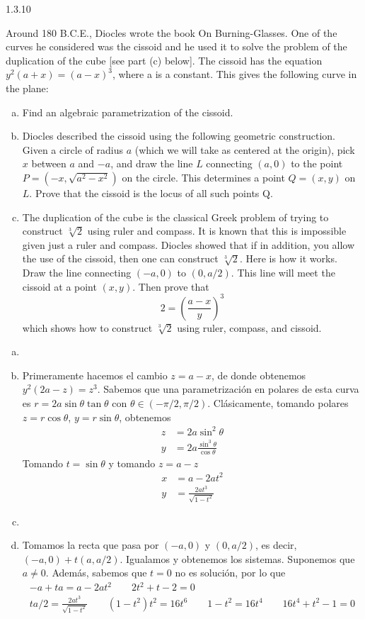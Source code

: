 \documentclass[twoside]{article}
\begin{document}
\begin{ejercicio}{1.3.10}

\end{ejercicio} Around 180 B.C.E., Diocles wrote the book On Burning-Glasses. One of the curves he considered was the cissoid and he used it to solve the problem of the duplication of the cube [see part (c) below]. The cissoid has the equation $y^2(a + x) = (a − x)^3$, where a is
a constant. This gives the following curve in the plane:
\begin{enumerate}[a.]
\item Find an algebraic parametrization of the cissoid.
\item Diocles described the cissoid using the following geometric construction. Given a circle of radius $a$ (which we will take as centered at the origin), pick $x$ between $a$ and $−a$, and draw the line $L$ connecting $(a, 0)$ to the point $P = (−x,\sqrt{a^2 − x^2})$ on the
circle. This determines a point $Q = (x, y)$ on $L$. Prove that the cissoid is the locus of all such points Q.
\item The duplication of the cube is the classical Greek problem of trying to construct $\sqrt[3]{2}$ using ruler and compass. It is known that this is impossible given just a ruler and  compass. Diocles showed that if in addition, you allow the use of the cissoid, then
one can construct $\sqrt[3]{2}$. Here is how it works. Draw the line connecting $(−a, 0)$ to $(0, a/2)$. This line will meet the cissoid at a point $(x, y)$. Then prove that
$$
2=\left(\frac{a-x}{y}\right)^3
$$
which shows how to construct $\sqrt[3]{2}$ using ruler, compass, and cissoid.
\end{enumerate}
\begin{solucion}
\begin{enumerate}[a.]
\item[]
\item Primeramente hacemos el cambio $z=a-x$, de donde obtenemos $y^2(2a-z)=z^3$. Sabemos que una parametrización en polares de esta curva es $ r=2a\sin \theta \tan \theta$ con $\theta\in(-\pi/2,\pi/2)$. Clásicamente, tomando polares $z=r\cos \theta$, $y=r\sin \theta$, obtenemos
\begin{align*}
z&=2a\sin^2\theta\\
y&= 2a\frac{\sin^3\theta}{\cos \theta}
\end{align*}
Tomando $t = \sin \theta$ y tomando $z=a-z$
\begin{align*}
x&=a-2at^2\\
y&=\frac{2at^3}{\sqrt{1-t^2}}
\end{align*}
\item 
\item Tomamos la recta que pasa por $(-a,0)$ y $(0,a/2)$, es decir, $(-a,0)+t(a,a/2)$. Igualamos y obtenemos los sistemas. Suponemos que $a\neq 0$. Además, sabemos que $t=0$ no es solución, por lo que
\begin{gather*}
-a+ta = a-2at^2 \qquad 2t^2	+t-2=0\\
ta/2 = \frac{2at^3}{\sqrt{1-t^2}} \qquad (1-t^2)t^2 = 16t^6 \qquad 1-t^2 = 16t^4 \qquad 16t^4+t^2-1=0
\end{gather*}
\end{enumerate}
\end{solucion}
\end{document}
